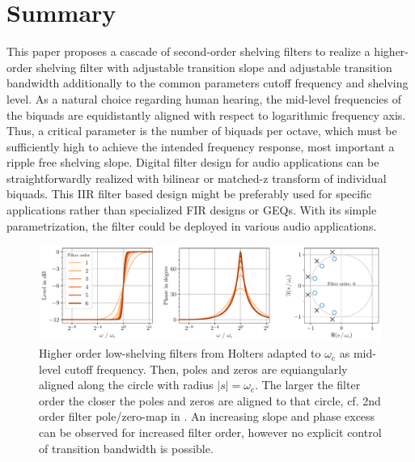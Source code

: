 \section{Summary}
\label{sec:summary}
%
This paper proposes a cascade of second-order shelving filters to realize a
higher-order shelving filter with adjustable transition slope and adjustable
transition bandwidth additionally to the common parameters cutoff frequency
and shelving level.
%
As a natural choice regarding human hearing, the mid-level frequencies of the
biquads are equidistantly aligned with respect to logarithmic frequency axis.
%
Thus, a critical parameter is the number of biquads per octave, which must be
sufficiently high to achieve the intended frequency response, most important
a ripple free shelving slope.
%
Digital filter design for audio applications can be straightforwardly realized
with bilinear or matched-z transform of individual biquads.
%
This IIR filter based design might be preferably used for specific
applications rather than specialized FIR designs or GEQs.
%
With its simple parametrization, the filter could be deployed in various
audio applications. %


\begin{figure}[h]
\centering
\includegraphics[width=\textwidth]{../graphics/holters2006-higher-order-shelving.pdf}
\caption{Higher order low-shelving filters from Holters \cite{Holters2006a}
adapted to $\omega_\mathrm{c}$ as mid-level cutoff frequency.
%
Then, poles and zeros are equiangularly aligned along the circle with radius
$|s| = \omega_\mathrm{c}$.
%
The larger the filter order the closer the poles and zeros are aligned to that
circle, cf. 2nd order filter pole/zero-map in .
%
An increasing slope and phase excess can be observed for increased filter order,
however no explicit control of transition bandwidth is possible.}
\label{fig:holters2006-higher-order-shelving}
\end{figure}




